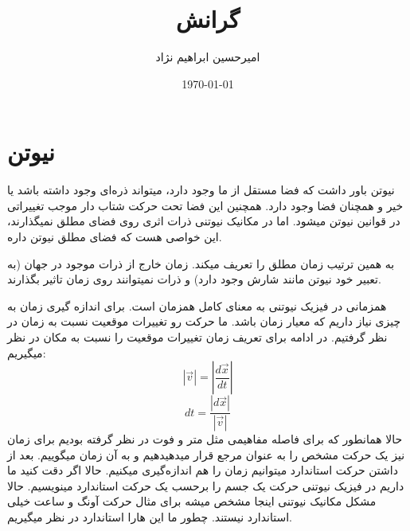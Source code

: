 \documentclass[9pt,a4paper, twocolumn]{article}
\title{گرانش}
\author{امیرحسین ابراهیم نژاد}
\date{\today}
\begin{document}
        \maketitle
        \tableofcontents
        \section{نیوتن}
            نیوتن باور داشت که فضا مستقل از ما وجود دارد، میتواند ذره‌ای وجود داشته باشد یا خیر و همچنان فضا وجود دارد. همچنین این فضا تحت حرکت شتاب دار موجب تغییراتی در قوانین نیوتن میشود. اما در مکانیک نیوتنی ذرات اثری روی فضای مطلق نمیگذارند، این خواصی هست که فضای مطلق نیوتن داره.
            
            به همین ترتیب زمان مطلق را تعریف میکند. زمان خارج از ذرات موجود در جهان (به تعبیر خود نیوتن مانند شارش وجود دارد) 
            و ذرات نمیتوانند روی زمان تاثیر بگذارند.

            همزمانی در فیزیک نیوتنی به معنای کامل همزمان است. برای اندازه گیری زمان به چیزی نیاز داریم که معیار زمان باشد. ما حرکت رو تغییرات موقعیت نسبت به زمان در نظر گرفتیم. در ادامه برای تعریف زمان تغییرات موقعیت را نسبت به مکان در نظر میگیریم:
            \begin{equation}
                |\vec v| = \left|\frac{d\vec x}{dt}\right|
            \end{equation}
            \begin{equation}
                dt = \frac{|d\vec x|}{|\vec v|}
            \end{equation}
            حالا همانطور که برای فاصله مفاهیمی مثل متر و فوت در نظر گرفته بودیم برای زمان نیز یک حرکت مشخص را به عنوان مرجع قرار میدهیدهیم و به آن زمان میگوییم. بعد از داشتن حرکت استاندارد میتوانیم زمان را هم اندازه‌گیری میکنیم. حالا اگر دقت کنید ما داریم در فیزیک نیوتنی حرکت یک جسم را برحسب یک حرکت استاندارد مینویسیم. حالا مشکل مکانیک نیوتنی اینجا مشخص میشه برای مثال حرکت آونگ و ساعت خیلی استاندارد نیستند. چطور ما این هارا استاندارد در نظر میگیریم.
\end{document}
